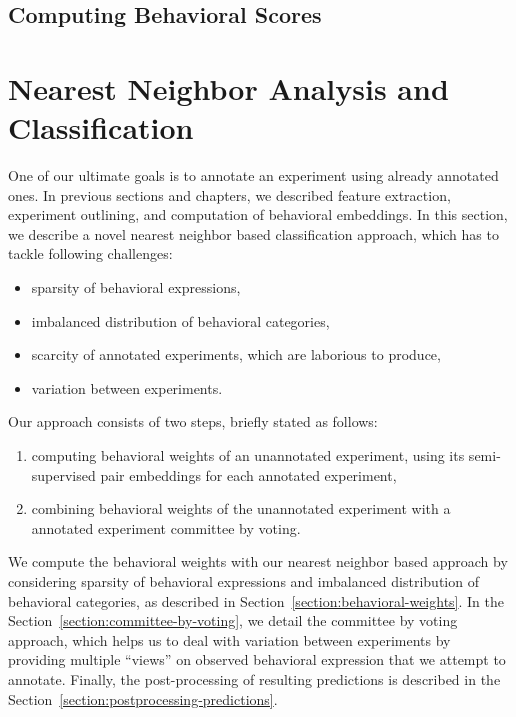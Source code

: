 \subsection{Computing Behavioral Scores}

\section{Nearest Neighbor Analysis and Classification}
One of our ultimate goals is to annotate an experiment using already annotated ones.
In previous sections and chapters, we described feature extraction, experiment outlining, and computation of behavioral embeddings.
In this section, we describe a novel nearest neighbor based classification approach, which has to tackle following challenges:
\begin{itemize}
	\item sparsity of behavioral expressions,
	\item imbalanced distribution of behavioral categories,
	\item scarcity of annotated experiments, which are laborious to produce,
	\item variation between experiments.
\end{itemize}
Our approach consists of two steps, briefly stated as follows:
\begin{enumerate}
	\item computing behavioral weights of an unannotated experiment, using its semi-supervised pair embeddings for each annotated  experiment,
	\item combining behavioral weights of the unannotated experiment with a annotated experiment committee by voting.
\end{enumerate}
We compute the behavioral weights with our nearest neighbor based approach by considering sparsity of behavioral expressions and imbalanced distribution of behavioral categories, as described in Section~\ref{section:behavioral-weights}.
In the Section~\ref{section:committee-by-voting}, we detail the committee by voting approach, which helps us to deal with variation between experiments by providing multiple ``views'' on observed behavioral expression that we attempt to annotate. Finally, the post-processing of resulting predictions is described in the Section~\ref{section:postprocessing-predictions}.

